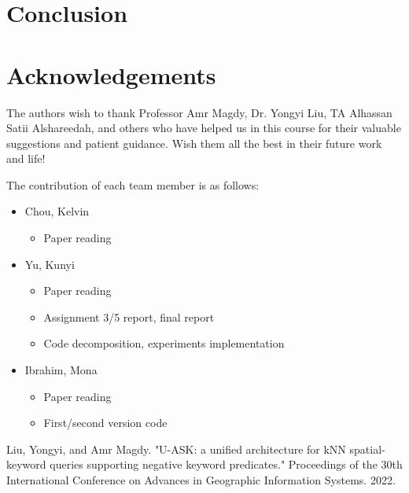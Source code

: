 \documentclass[]{IEEEphot}
\begin{document}
\section{Conclusion}









\newpage

\section*{Acknowledgements}
The authors wish to thank Professor Amr Magdy, Dr. Yongyi Liu, TA Alhassan Satii Alshareedah, and others who have helped us in this course for their valuable suggestions and patient guidance. Wish them all the best in their future work and life!

The contribution of each team member is as follows:

\begin{itemize}
\item Chou, Kelvin
    \begin{itemize}
        \item Paper reading
    \end{itemize}
\item Yu, Kunyi
    \begin{itemize}
        \item Paper reading
        \item Assignment 3/5 report, final report
        \item Code decomposition, experiments implementation
    \end{itemize}
\item Ibrahim, Mona
    \begin{itemize}
        \item Paper reading
        \item First/second version code
    \end{itemize}
\end {itemize}

\begin{thebibliography}{10}
     Liu, Yongyi, and Amr Magdy. "U-ASK: a unified architecture for kNN spatial-keyword queries supporting negative keyword predicates." Proceedings of the 30th International Conference on Advances in Geographic Information Systems. 2022.
\end{thebibliography}
\end{document}
